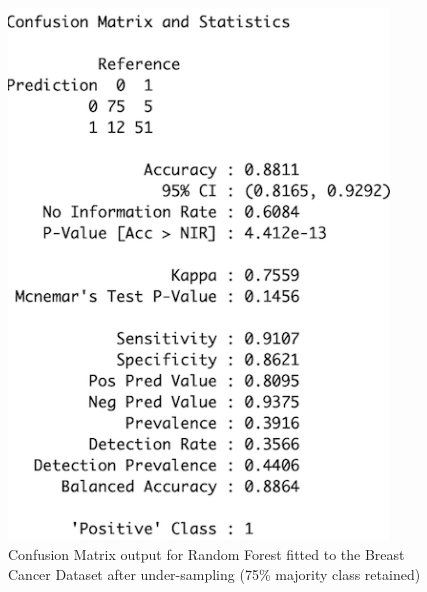 \begin{figure}[!htbp]
\begin{minipage}{0.45\textwidth}
        \includegraphics[width=0.9\textwidth]{ThesisTemplate/appendix/images/Chapter5Appendix/ConfusionMatrix75/BreastCancer.png}
        \caption{Confusion Matrix output for Random Forest fitted to the Breast Cancer Dataset after under-sampling (75\% majority class retained)}
        \label{fig:matrixAutism75}
    \end{minipage}
\end{figure}

